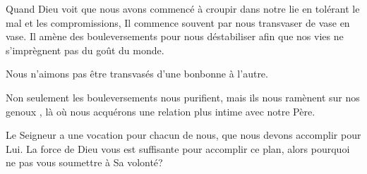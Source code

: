 Quand Dieu voit que nous avons commencé à croupir dans notre lie
 en tolérant le mal et les compromissions,
 Il commence souvent par nous transvaser de vase en vase.
 Il amène des bouleversements pour nous déstabiliser afin que nos vies
 ne s'imprègnent pas du goût du monde. 

Nous n'aimons pas être transvasés d'une bonbonne à l'autre. 


Non seulement les bouleversements nous purifient,
 mais ils nous ramènent \Og sur nos genoux \Fg{},
 là où nous acquérons une relation plus intime
 avec notre Père. 

Le Seigneur a une vocation pour chacun de nous,
 que nous devons accomplir pour Lui.
 La force de Dieu vous est suffisante pour accomplir ce plan,
 alors pourquoi ne pas vous soumettre à Sa volonté? 

\dvrule



